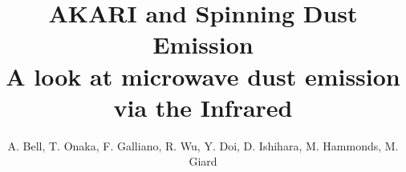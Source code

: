 \documentclass[12pt, manuscript]{aastex}
\begin{document}
\title{AKARI and Spinning Dust Emission\\
A look at microwave dust emission via the Infrared}

\author{A. Bell, T. Onaka, F. Galliano, R. Wu, Y. Doi, D. Ishihara, M. Hammonds, M. Giard}



\maketitle









\small


\end{document}

